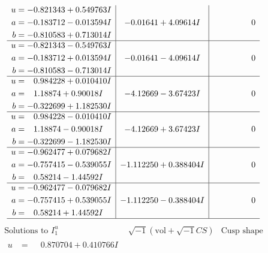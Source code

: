 \documentclass[1p]{elsarticle_modified}
\theoremstyle{definition}
\newcommand{\I}{\sqrt{-1}}
\begin{document}
$$\begin{array}{c|c|c}
\begin{aligned}
u &= -0.821343 + 0.549763 I \\
a &= -0.183712 - 0.013594 I \\
b &= -0.810583 + 0.713014 I\end{aligned}
 & -0.01641 + 4.09614 I & \phantom{-0.000000 } 0 \\ \hline\begin{aligned}
u &= -0.821343 - 0.549763 I \\
a &= -0.183712 + 0.013594 I \\
b &= -0.810583 - 0.713014 I\end{aligned}
 & -0.01641 - 4.09614 I & \phantom{-0.000000 } 0 \\ \hline\begin{aligned}
u &= \phantom{-}0.984228 + 0.010410 I \\
a &= \phantom{-}1.18874 + 0.90018 I \\
b &= -0.322699 + 1.182530 I\end{aligned}
 & -4.12669 - 3.67423 I & \phantom{-0.000000 } 0 \\ \hline\begin{aligned}
u &= \phantom{-}0.984228 - 0.010410 I \\
a &= \phantom{-}1.18874 - 0.90018 I \\
b &= -0.322699 - 1.182530 I\end{aligned}
 & -4.12669 + 3.67423 I & \phantom{-0.000000 } 0 \\ \hline\begin{aligned}
u &= -0.962477 + 0.079682 I \\
a &= -0.757415 - 0.539055 I \\
b &= \phantom{-}0.58214 - 1.44592 I\end{aligned}
 & -1.112250 + 0.388404 I & \phantom{-0.000000 } 0 \\ \hline\begin{aligned}
u &= -0.962477 - 0.079682 I \\
a &= -0.757415 + 0.539055 I \\
b &= \phantom{-}0.58214 + 1.44592 I\end{aligned}
 & -1.112250 - 0.388404 I & \phantom{-0.000000 } 0\\
 \hline 
 \end{array}$$\newpage$$\begin{array}{c|c|c}  
\text{Solutions to }I^u_{1}& \I (\text{vol} + \sqrt{-1}CS) & \text{Cusp shape}\\
 \hline 
\begin{aligned}
u &= \phantom{-}0.870704 + 0.410766 I \\

\end{aligned}
\end{array}$$
\end{document}
